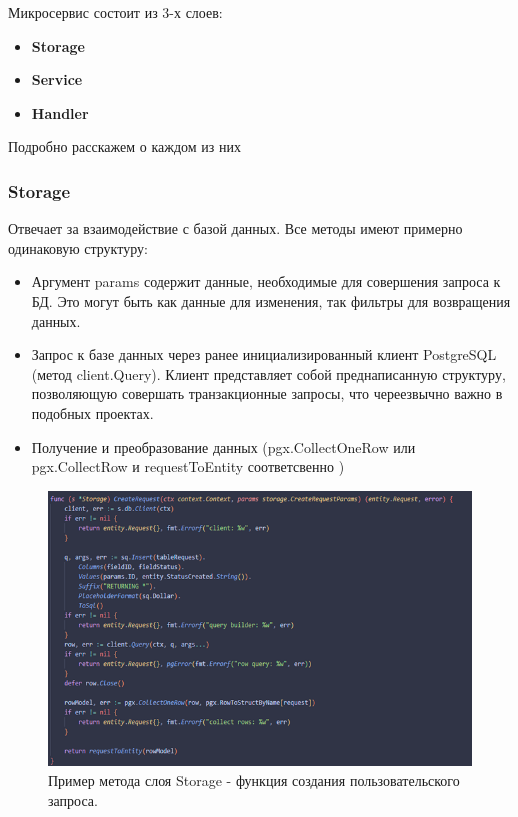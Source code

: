 \begin{itemize}
Микросервис состоит из 3-х слоев:
\begin{itemize}
\item  \textbf{Storage}
\item  \textbf{Service}
\item  \textbf{Handler}
\end{itemize}
Подробно расскажем о каждом из них

\subsubsection{Storage}
Отвечает за взаимодействие с базой данных.
Все методы имеют примерно одинаковую структуру:
\begin{itemize}
\item Аргумент params содержит данные, необходимые для совершения запроса к БД. Это могут быть как данные для изменения, так фильтры для возвращения данных.
\item  Запрос к базе данных через ранее инициализированный клиент PostgreSQL (метод client.Query).
Клиент представляет собой преднаписанную структуру, позволяющую совершать транзакционные запросы, что череезвычно важно в подобных проектах.
\item  Получение и преобразование данных (pgx.CollectOneRow или pgx.CollectRow и requestToEntity соответсвенно )
\end{itemize}



\begin{figure}[H]
    \centering
    \includegraphics[width=1\textwidth]{styles/diploma/inc/storage1.png} 
    \caption{Пример метода слоя Storage -  функция создания пользовательского запроса.}
    \label{fig:example}
\end{figure}


\end{itemize}
